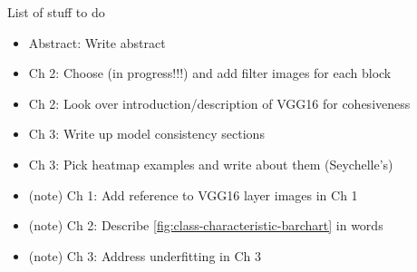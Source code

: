 
List of stuff to do

\begin{itemize}
\item Abstract: Write abstract
\item Ch 2: Choose (in progress!!!) and add filter images for each block
\item Ch 2: Look over introduction/description of VGG16 for cohesiveness
\item Ch 3: Write up model consistency sections
\item Ch 3: Pick heatmap examples and write about them (Seychelle's)

\item (\fix note) Ch 1: Add reference to VGG16 layer images in Ch 1
\item (\fix note) Ch 2: Describe \autoref{fig:class-characteristic-barchart} in words
\item (\fix note) Ch 3: Address underfitting in Ch 3
\end{itemize}
